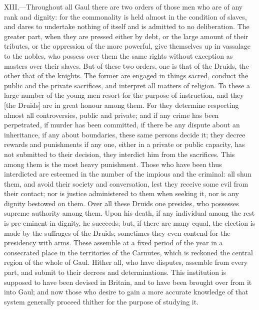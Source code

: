 XIII.—Throughout all Gaul there are two orders of those men who are of
any rank and dignity: for the commonality is held almost in the
condition of slaves, and dares to undertake nothing of itself and is
admitted to no deliberation. The greater part, when they are pressed
either by debt, or the large amount of their tributes, or the oppression
of the more powerful, give themselves up in vassalage to the nobles, who
possess over them the same rights without exception as masters over
their slaves. But of these two orders, one is that of the Druids, the
other that of the knights. The former are engaged in things sacred,
conduct the public and the private sacrifices, and interpret all matters
of religion. To these a large number of the young men resort for the
purpose of instruction, and they [the Druids] are in great honour among
them. For they determine respecting almost all controversies, public and
private; and if any crime has been perpetrated, if murder has been
committed, if there be any dispute about an inheritance, if any about
boundaries, these same persons decide it; they decree rewards and
punishments if any one, either in a private or public capacity, has not
submitted to their decision, they interdict him from the sacrifices.
This among them is the most heavy punishment. Those who have been thus
interdicted are esteemed in the number of the impious and the criminal:
all shun them, and avoid their society and conversation, lest they
receive some evil from their contact; nor is justice administered to
them when seeking it, nor is any dignity bestowed on them. Over all
these Druids one presides, who possesses supreme authority among them.
Upon his death, if any individual among the rest is pre-eminent in
dignity, he succeeds; but, if there are many equal, the election is made
by the suffrages of the Druids; sometimes they even contend for the
presidency with arms. These assemble at a fixed period of the year in a
consecrated place in the territories of the Carnutes, which is reckoned
the central region of the whole of Gaul. Hither all, who have disputes,
assemble from every part, and submit to their decrees and
determinations. This institution is supposed to have been devised in
Britain, and to have been brought over from it into Gaul; and now those
who desire to gain a more accurate knowledge of that system generally
proceed thither for the purpose of studying it.

